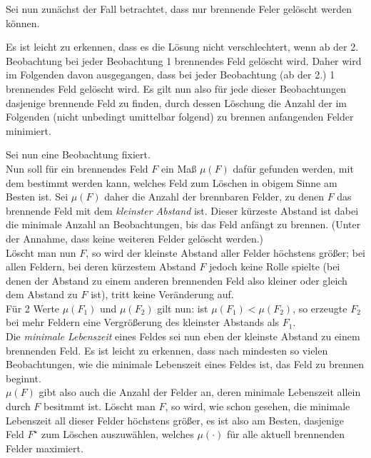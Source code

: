 Sei nun zunächst der Fall betrachtet, dass nur brennende Feler gelöscht werden können.

Es ist leicht zu erkennen, dass es die Lösung nicht verschlechtert, wenn ab der 2. Beobachtung bei jeder Beobachtung 1 brennendes Feld gelöscht wird. Daher wird im Folgenden davon ausgegangen, dass bei jeder Beobachtung (ab der 2.) 1 brennendes Feld gelöscht wird. Es gilt nun also für jede dieser Beobachtungen dasjenige brennende Feld zu finden, durch dessen Löschung die Anzahl der im Folgenden (nicht unbedingt umittelbar folgend) zu brennen anfangenden Felder minimiert.

Sei nun eine Beobachtung fixiert.\\
Nun soll für ein brennendes Feld $F$ ein Maß $\mu(F)$ dafür gefunden werden, mit dem bestimmt werden kann, welches Feld zum Löschen in obigem Sinne am Besten ist. Sei $\mu(F)$ daher die Anzahl der brennbaren Felder, zu denen $F$ das brennende Feld mit dem \emph{kleinster Abstand} ist. Dieser kürzeste Abstand ist dabei die minimale Anzahl an Beobachtungen, bis das Feld anfängt zu brennen. (Unter der Annahme, dass keine weiteren Felder gelöscht werden.)\\
Löscht man nun $F$, so wird der kleinste Abstand aller Felder höchstens größer; bei allen Feldern, bei deren kürzestem Abstand $F$ jedoch keine Rolle spielte (bei denen der Abstand zu einem anderen brennenden Feld also kleiner oder gleich dem Abstand zu $F$ ist), tritt keine Veränderung auf.\\
Für 2 Werte $\mu(F_1)$ und $\mu(F_2)$ gilt nun: ist $\mu(F_1) < \mu(F_2)$, so erzeugte $F_2$ bei mehr Feldern eine Vergrößerung des kleinster Abstands als $F_1$.\\
Die \emph{minimale Lebenszeit} eines Feldes sei nun eben der kleinste Abstand zu einem brennenden Feld. Es ist leicht zu erkennen, dass nach mindesten so vielen Beobachtungen, wie die minimale Lebenszeit eines Feldes ist, das Feld zu brennen beginnt.\\
$\mu(F)$ gibt also auch die Anzahl der Felder an, deren minimale Lebenszeit allein durch $F$ besitmmt ist. Löscht man $F$, so wird, wie schon gesehen, die minimale Lebenszeit all dieser Felder höchstens größer, es ist also am Besten, dasjenige Feld $F^\star$ zum Löschen auszuwählen, welches $\mu(\cdot)$ für alle aktuell brennenden Felder maximiert.

